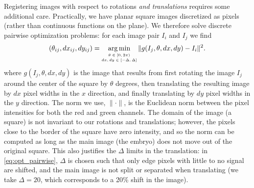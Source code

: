 \documentclass{pnastwo}
\DeclareMathOperator*{\argmin}{arg\,min}
\begin{document}
\begin{article}
\begin{materials}
Registering images with respect to rotations {\em and translations} requires some additional care.
%
%
%
Practically, we have planar square images discretized as pixels (rather than continuous functions on the plane).
%
We therefore solve discrete pairwise optimization problems: for each image pair $I_i$ and $I_j$ we find
\begin{equation}\label{eq:opt_pairwise}
(\theta_{ij}, dx_{ij}, dy_{ij}) = \argmin_{
\scriptsize \begin{matrix}
\theta \in [0, 2\pi) \\
dx, dy \in [-\Delta, \Delta]\\
\end{matrix}
} \|g(I_j, \theta, dx, dy) - I_i \|^2.
\end{equation}
where $g(I_j, \theta, dx, dy)$ is the image that results from first rotating the image $I_j$ around the center of the square by $\theta$ degrees, then translating the resulting
image by $dx$ pixel widths in the $x$ direction, and finally translating by $dy$ pixel widths in the $y$ direction.
%
The norm we use, $\| \cdot \|$, is the Euclidean norm between the pixel intensities for both the red and green channels.
%
The domain of the image (a square) is not invariant to our rotations and translations; however, the pixels close to the border of the square have zero intensity, and so the norm can be computed as long as the main image (the embryo) does not move out of the original square.
%
%
This also justifies the $\Delta$ limits in the translation: 
in \eqref{eq:opt_pairwise}, $\Delta$ is chosen such that only edge pixels with little to no signal are shifted, and the main image is not split or separated when translating (we take $\Delta=20$, which corresponds to a 20\% shift in the image).%

\end{materials}
\end{article}
\end{document}
